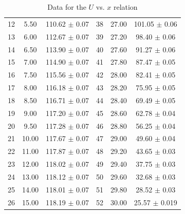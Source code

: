 \documentclass[a4paper]{article}
\begin{document}
\begin{table}[htbp]
\begin{tabular}{ccc||ccc}
		12 & 5.50                 & 110.62 $\pm$ 0.07                                    & 38 & 27.00                & 101.05 $\pm$ 0.06                                    \\
		13 & 6.00                 & 112.67 $\pm$ 0.07                                    & 39 & 27.20                & 98.40 $\pm$ 0.06                                     \\
		14 & 6.50                 & 113.90 $\pm$ 0.07                                    & 40 & 27.60                & 91.27 $\pm$ 0.06                                     \\
		15 & 7.00                 & 114.90 $\pm$ 0.07                                    & 41 & 27.80                & 87.47 $\pm$ 0.05                                     \\
		16 & 7.50                 & 115.56 $\pm$ 0.07                                    & 42 & 28.00                & 82.41 $\pm$ 0.05                                     \\
		17 & 8.00                 & 116.18 $\pm$ 0.07                                    & 43 & 28.20                & 75.95 $\pm$ 0.05                                     \\
		18 & 8.50                 & 116.71 $\pm$ 0.07                                    & 44 & 28.40                & 69.49 $\pm$ 0.05                                     \\
		19 & 9.00                 & 117.20 $\pm$ 0.07                                    & 45 & 28.60                & 62.78 $\pm$ 0.04                                     \\
		20 & 9.50                 & 117.28 $\pm$ 0.07                                    & 46 & 28.80                & 56.25 $\pm$ 0.04                                     \\
		21 & 10.00                & 117.67 $\pm$ 0.07                                    & 47 & 29.00                & 49.60 $\pm$ 0.04                                     \\
		22 & 11.00                & 117.87 $\pm$ 0.07                                    & 48 & 29.20                & 43.65 $\pm$ 0.03                                     \\
		23 & 12.00                & 118.02 $\pm$ 0.07                                    & 49 & 29.40                & 37.75 $\pm$ 0.03                                     \\
		24 & 13.00                & 118.12 $\pm$ 0.07                                    & 50 & 29.60                & 32.68 $\pm$ 0.03                                     \\
		25 & 14.00                & 118.01 $\pm$ 0.07                                    & 51 & 29.80                & 28.52 $\pm$ 0.03                                     \\
		26 & 15.00                & 118.19 $\pm$ 0.07                                    & 52 & 30.00                & 25.57 $\pm$ 0.019                                    \\
		\hline
	\end{tabular}
	\caption{Data for the $U$ vs. $x$ relation}\label{TableUx}
\end{table}
\end{document}
